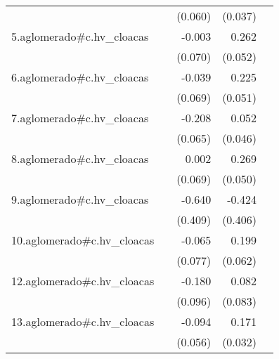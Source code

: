 {\begin{longtable}{l*{4}{D{.}{.}{-1}}}
            &                     &     (0.060)         &     (0.037)         &                     \\
\addlinespace
5.aglomerado#c.hv\_cloacas&                     &      -0.003         &       0.262\sym{***}&                     \\
            &                     &     (0.070)         &     (0.052)         &                     \\
\addlinespace
6.aglomerado#c.hv\_cloacas&                     &      -0.039         &       0.225\sym{***}&                     \\
            &                     &     (0.069)         &     (0.051)         &                     \\
\addlinespace
7.aglomerado#c.hv\_cloacas&                     &      -0.208\sym{**} &       0.052         &                     \\
            &                     &     (0.065)         &     (0.046)         &                     \\
\addlinespace
8.aglomerado#c.hv\_cloacas&                     &       0.002         &       0.269\sym{***}&                     \\
            &                     &     (0.069)         &     (0.050)         &                     \\
\addlinespace
9.aglomerado#c.hv\_cloacas&                     &      -0.640         &      -0.424         &                     \\
            &                     &     (0.409)         &     (0.406)         &                     \\
\addlinespace
10.aglomerado#c.hv\_cloacas&                     &      -0.065         &       0.199\sym{**} &                     \\
            &                     &     (0.077)         &     (0.062)         &                     \\
\addlinespace
12.aglomerado#c.hv\_cloacas&                     &      -0.180         &       0.082         &                     \\
            &                     &     (0.096)         &     (0.083)         &                     \\
\addlinespace
13.aglomerado#c.hv\_cloacas&                     &      -0.094         &       0.171\sym{***}&                     \\
            &                     &     (0.056)         &     (0.032)         &                     \\

\end{longtable}}
